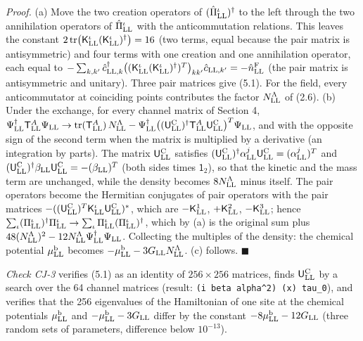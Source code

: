 \documentclass[
  10pt,
]{article}
\begin{document}
\emph{Proof.} (a) Move the two creation operators of
\((\hat\Pi^\iota_{\rm LL})^\dagger\) to the left through the two
annihilation operators of \(\hat\Pi^\iota_{\rm LL}\) with the
anticommutation relations. This leaves the constant
\(2\,\mathrm{tr}\big(\mathsf K^\iota_{\rm LL}(\mathsf K^\iota_{\rm LL})^\dagger\big)=16\)
(two terms, equal because the pair matrix is antisymmetric) and four
terms with one creation and one annihilation operator, each equal to
\(-\sum_{k,k'}\hat c^\dagger_{{\rm LL},k}\big((\mathsf K^\iota_{\rm LL}(\mathsf K^\iota_{\rm LL})^\dagger)^T\big)_{kk'}\hat c_{{\rm LL},k'}=-\hat n^{\rm F}_{\rm LL}\)
(the pair matrix is antisymmetric and unitary). Three pair matrices give
(5.1). For the field, every anticommutator at coinciding points
contributes the factor \(N^\Lambda_{\rm LL}\) of (2.6). (b) Under the
exchange, for every channel matrix of Section 4,
\(\Psi^\dagger_{\rm LL}\mathsf T^A_{\rm LL}\Psi_{\rm LL}\to\mathrm{tr}(\mathsf T^A_{\rm LL})\,N^\Lambda_{\rm LL}-\Psi^\dagger_{\rm LL}\big((\mathsf U^{\rm C}_{\rm LL})^\dagger\mathsf T^A_{\rm LL}\mathsf U^{\rm C}_{\rm LL}\big)^T\Psi_{\rm LL}\),
and with the opposite sign of the second term when the matrix is
multiplied by a derivative (an integration by parts). The matrix
\(\mathsf U^{\rm C}_{\rm LL}\) satisfies
\((\mathsf U^{\rm C}_{\rm LL})^\dagger\alpha^j_{\rm LL}\mathsf U^{\rm C}_{\rm LL}=(\alpha^j_{\rm LL})^T\)
and
\((\mathsf U^{\rm C}_{\rm LL})^\dagger\beta_{\rm LL}\mathsf U^{\rm C}_{\rm LL}=-(\beta_{\rm LL})^T\)
(both sides times \(\mathsf 1_2\)), so that the kinetic and the mass
term are unchanged, while the density becomes \(8N^\Lambda_{\rm LL}\)
minus itself. The pair operators become the Hermitian conjugates of pair
operators with the pair matrices
\(-((\mathsf U^{\rm C}_{\rm LL})^T\mathsf K^\iota_{\rm LL}\mathsf U^{\rm C}_{\rm LL})^*\),
which are \(-\mathsf K^1_{\rm LL}\), \(+\mathsf K^2_{\rm LL}\),
\(-\mathsf K^3_{\rm LL}\); hence
\(\sum_\iota(\Pi^\iota_{\rm LL})^\dagger\Pi^\iota_{\rm LL}\to\sum_\iota\Pi^\iota_{\rm LL}(\Pi^\iota_{\rm LL})^\dagger\),
which by (a) is the original sum plus
\(48(N^\Lambda_{\rm LL})^2-12N^\Lambda_{\rm LL}\Psi^\dagger_{\rm LL}\Psi_{\rm LL}\).
Collecting the multiples of the density: the chemical potential
\(\mu^{\rm b}_{\rm LL}\) becomes
\(-\mu^{\rm b}_{\rm LL}-3G_{\rm LL}N^\Lambda_{\rm LL}\). (c) follows.
\(\blacksquare\)

\emph{Check CJ-3} verifies (5.1) as an identity of \(256\times256\)
matrices, finds \(\mathsf U^{\rm C}_{\rm LL}\) by a search over the 64
channel matrices (result: \texttt{(i\ beta\ alpha\^{}2)\ (x)\ tau\_0}),
and verifies that the 256 eigenvalues of the Hamiltonian of one site at
the chemical potentials \(\mu^{\rm b}_{\rm LL}\) and
\(-\mu^{\rm b}_{\rm LL}-3G_{\rm LL}\) differ by the constant
\(-8\mu^{\rm b}_{\rm LL}-12G_{\rm LL}\) (three random sets of
parameters, difference below \(10^{-13}\)).
\end{document}
